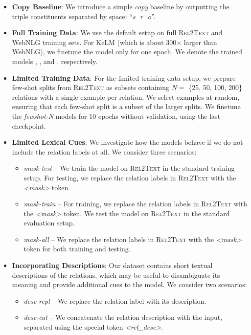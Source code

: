 \begin{itemize}
    \item \textbf{Copy Baseline}: We introduce a simple \textit{copy} baseline by outputting the triple constituents separated by space: ``$s\text{ }r\text{ }o$''.



    \item \textbf{Full Training Data}: We use the default setup on full \textsc{Rel2Text} and WebNLG training sets. For KeLM (which is about 300$\times$ larger than WebNLG), we finetune the model only for one epoch. We denote the trained models \BARTr{}, \BARTw{}, and \BARTk{}, respectively.

    \item \textbf{Limited Training Data}: For the limited training data setup, we prepare few-shot splits from \textsc{Rel2Text} as subsets containing $N=$ \{25, 50, 100, 200\} relations with a single example per relation. We select examples at random, ensuring that each few-shot split is a subset of the larger splits. We finetune the \textit{fewshot-N} models for 10 epochs without validation, using the last checkpoint.

    \item \textbf{Limited Lexical Cues}: We investigate how the models behave if we do not include the relation labels at all. We consider three scenarios:
          \begin{itemize}
              \item \textit{mask-test} -- We train the model on \textsc{Rel2Text} in the standard training setup. For testing, we replace the relation labels in  \textsc{Rel2Text} with the \textit{<mask>} token.
              \item \textit{mask-train} -- For training, we replace the relation labels in  \textsc{Rel2Text} with the \textit{<mask>} token. We test the model on \textsc{Rel2Text} in the standard evaluation setup.
              \item \textit{mask-all} -- We replace the relation labels in  \textsc{Rel2Text} with the \textit{<mask>} token for both training and testing.
          \end{itemize}


    \item \textbf{Incorporating Descriptions}: Our dataset contains short textual descriptions of the relations, which may be useful to disambiguate its meaning and provide additional cues to the model. We consider two scenarios:
          \begin{itemize}
              \item \textit{desc-repl} -- We replace the relation label with its description.
              \item \textit{desc-cat} -- We concatenate the relation description with the input, separated using the special token \textit{<rel\_desc>}.
          \end{itemize}
\end{itemize}


